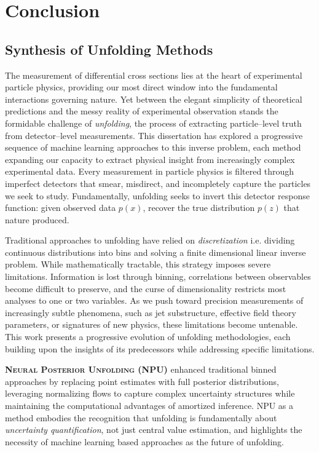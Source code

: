 \chapter{Conclusion}
\label{chap:conclusion}
\section{Synthesis of Unfolding Methods}
    The measurement of differential cross sections lies at the heart of experimental particle physics, providing our most direct window into the fundamental interactions governing nature.
    Yet between the elegant simplicity of theoretical predictions and the messy reality of experimental observation stands the formidable challenge of \emph{unfolding}, the process of extracting particle--level truth from detector--level measurements.
    This dissertation has explored a progressive sequence of machine learning approaches to this inverse problem, each method expanding our capacity to extract physical insight from increasingly complex experimental data.
    Every measurement in particle physics is filtered through imperfect detectors that smear, misdirect, and incompletely capture the particles we seek to study.
    Fundamentally, unfolding seeks to invert this detector response function: given observed data \(p(x)\), recover the true distribution \(p(z)\) that nature produced.

    Traditional approaches to unfolding have relied on \emph{discretization} i.e. dividing continuous distributions into bins and solving a finite dimensional linear inverse problem.
    While mathematically tractable, this strategy imposes severe limitations.
    Information is lost through binning, correlations between observables become difficult to preserve, and the curse of dimensionality restricts most analyses to one or two variables.
    As we push toward precision measurements of increasingly subtle phenomena, such as jet substructure, effective field theory parameters, or signatures of new physics, these limitations become untenable.
    This work presents a {progressive evolution} of unfolding methodologies, each building upon the insights of its predecessors while addressing specific limitations.
    
    \textbf{\textsc{Neural Posterior Unfolding} (NPU)} enhanced traditional binned approaches by replacing point estimates with full posterior distributions, leveraging normalizing flows to capture complex uncertainty structures while maintaining the computational advantages of amortized inference.
    NPU as a method embodies the recognition that unfolding is fundamentally about \emph{uncertainty quantification}, not just central value estimation, and highlights the necessity of machine learning based approaches as the future of unfolding.
    
